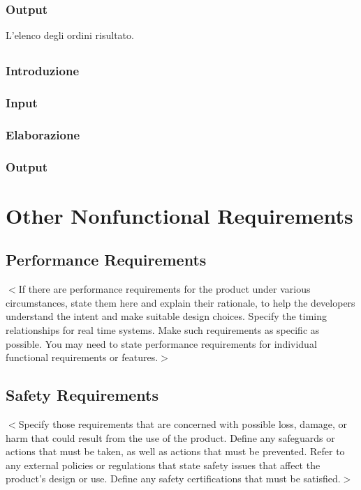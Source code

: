 \documentclass{scrreprt}
\begin{document}
\subsection*{Output}
L'elenco degli ordini risultato.

\section{}

\subsection*{Introduzione}
\subsection*{Input}
\subsection*{Elaborazione}
\subsection*{Output}


\chapter{Other Nonfunctional Requirements}

\section{Performance Requirements}
$<$If there are performance requirements for the product under various
circumstances, state them here and explain their rationale, to help the
developers understand the intent and make suitable design choices. Specify the
timing relationships for real time systems. Make such requirements as specific
as possible. You may need to state performance requirements for individual
functional requirements or features.$>$

\section{Safety Requirements}
$<$Specify those requirements that are concerned with possible loss, damage, or
harm that could result from the use of the product. Define any safeguards or
actions that must be taken, as well as actions that must be prevented. Refer to
any external policies or regulations that state safety issues that affect the
product’s design or use. Define any safety certifications that must be
satisfied.$>$
\end{document}
